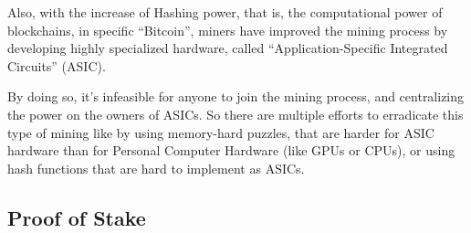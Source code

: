 Also, with the increase of Hashing power, that is, the computational power of blockchains, in specific ``Bitcoin'', miners have improved the mining process by developing highly specialized hardware, called ``Application-Specific Integrated Circuits'' (ASIC).

By doing so, it's infeasible for anyone to join the mining process, and centralizing the power on the owners of ASICs. So there are multiple efforts to erradicate this type of mining like by using memory-hard puzzles, that are harder for ASIC hardware than for Personal Computer Hardware (like GPUs or CPUs), or using hash functions that are hard to implement as ASICs.

\subsection{\textbf{Proof of Stake}}
